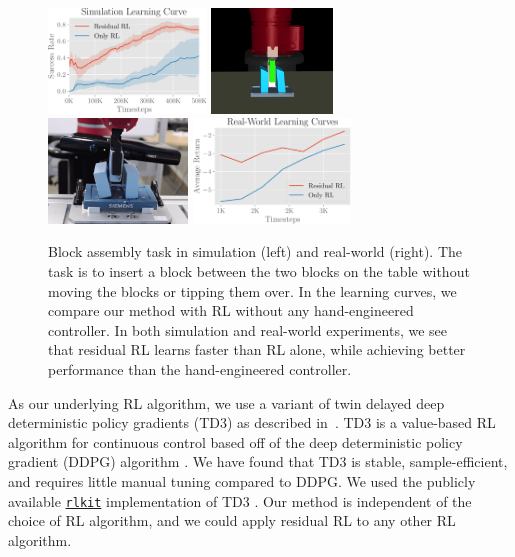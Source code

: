 \begin{figure}[t]
    \vspace{6pt}
    \centering
    \includegraphics[height=1.1in]{residualrl/figs/sim_learning_curve3.pdf}
    \includegraphics[height=1.1in]{residualrl/figs/sawyer_env.png} 
    \hspace{1cm}
    \includegraphics[height=1.1in]{residualrl/figs/real_world_env.png} 
    \vspace{0.1cm}
    \includegraphics[height=1.1in]{residualrl/figs/real_residualrl_comparison.pdf}
    \caption{Block assembly task in simulation (left) and  real-world (right). The task is to insert a block between the two blocks on the table without moving the blocks or tipping them over. In the learning curves, we compare our method with RL without any hand-engineered controller\protect\footnotemark. In both simulation and real-world experiments, we see that residual RL learns faster than RL alone, while achieving better performance than the hand-engineered controller. }%
    \label{fig:fig2}
\end{figure}

As our underlying RL algorithm, we use a variant of twin delayed deep deterministic policy gradients (TD3)
as described in~\cite{fujimoto2018td3}. TD3 is a value-based RL algorithm for continuous control based off of the deep deterministic policy gradient (DDPG) algorithm \cite{lillicrap2015continuous}. We have found that TD3 is stable, sample-efficient, and requires little manual tuning compared to DDPG.
We used the publicly available \href{https://github.com/vitchyr/rlkit}{\texttt{rlkit}} implementation of TD3 \cite{pong2018tdm}. Our method is independent of the choice of RL algorithm, and we could apply residual RL to any other RL algorithm.